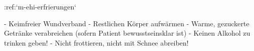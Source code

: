 :ref:`m-ehi-erfrierungen`
\begin{itemize}
  -   Keimfreier Wundverband
  -   Restlichen Körper aufwärmen
  -   Warme, gezuckerte Getränke verabreichen (sofern Patient 
  bewusstseinsklar ist)
  -   Keinen Alkohol zu trinken geben!
  -   Nicht frottieren, nicht mit Schnee abreiben! 
\end{itemize}